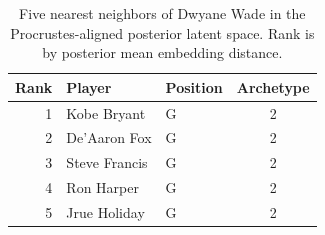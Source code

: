 \begin{table}[htbp]
  \centering\small
  \begin{tabular}{rllc}
    \toprule
    Rank & Player & Position & Archetype \\
    \midrule
    1 & Kobe Bryant & G & 2 \\
    2 & De'Aaron Fox & G & 2 \\
    3 & Steve Francis & G & 2 \\
    4 & Ron Harper & G & 2 \\
    5 & Jrue Holiday & G & 2 \\
    \bottomrule
  \end{tabular}
  \caption{Five nearest neighbors of Dwyane Wade in the Procrustes-aligned posterior latent space. Rank is by posterior mean embedding distance.}
  \label{tab:Dwyane_Wade_neighbors}
\end{table}

